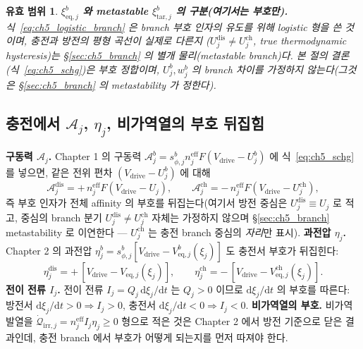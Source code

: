 \documentclass[11pt,a4paper]{article}
\newtheorem*{boundbox}{유효 범위}
\newcommand{\dd}{\mathrm{d}}
\newcommand{\eff}{\mathrm{eff}}
\newcommand{\eq}{\mathrm{eq}}
\newcommand{\drive}{\mathrm{drive}}
\newcommand{\irr}{\mathrm{irr}}
\newcommand{\dis}{\mathrm{dis}}
\newcommand{\chg}{\mathrm{ch}}
\newcommand{\tar}{\mathrm{tar}}
\begin{document}
\begin{boundbox}
\textbf{$\xi_{\eq,j}^b$ 와 metastable $\xi_{\tar,j}^b$ 의 구분(여기서는 부호만).} 식~\eqref{eq:ch5_logistic_branch}
은 branch 부호 인자의 유도를 위해 logistic 형을 쓴 것이며, 충전과 방전의 평형 곡선이 \emph{실제로 다른지}
($U_j^\dis\ne U_j^\chg$, true thermodynamic hysteresis)는 \S\ref{sec:ch5_branch} 의 별개 물리(metastable
branch)다. 본 절의 결론(식~\eqref{eq:ch5_schg})은 부호 정합이며, $U_j^b,w_j^b$ 의 branch 차이를 가정하지
않는다(그것은 \S\ref{sec:ch5_branch} 의 metastability 가 정한다).
\end{boundbox}

\subsection{충전에서 $\mathcal A_j$, $\eta_j$, 비가역열의 부호 뒤집힘}\label{sec:ch5_sign_flip}
\textbf{구동력 $\mathcal A_j$.} Chapter 1 의 구동력 $\mathcal A_j^b=s_{\phi,j}^b n_j^{\eff}F(V_\drive-U_j^b)$ 에
식~\eqref{eq:ch5_schg} 를 넣으면, 같은 전위 편차 $(V_\drive-U_j^b)$ 에 대해
\begin{equation}
\mathcal A_j^\dis=+\,n_j^{\eff}F(V_\drive-U_j),\qquad
\mathcal A_j^\chg=-\,n_j^{\eff}F(V_\drive-U_j^\chg),
\label{eq:ch5_A_branch}
\end{equation}
즉 부호 인자가 전체 affinity 의 부호를 뒤집는다(여기서 방전 중심은 $U_j^\dis\equiv U_j$ 로 적고, 중심의 branch
분기 $U_j^\dis\ne U_j^\chg$ 자체는 가정하지 않으며 \S\ref{sec:ch5_branch} metastability 로 이연한다 — $U_j^\chg$ 는
충전 branch 중심의 \emph{자리}만 표시). \textbf{과전압 $\eta_j$.} Chapter 2 의 과전압 $\eta_j^b=s_{\phi,j}^b
[V_\drive-V_{\eq,j}^b(\xi_j)]$ 도 충전서 부호가 뒤집힌다:
\begin{equation}
\eta_j^\dis=+\,[V_\drive-V_{\eq,j}(\xi_j)],\qquad
\eta_j^\chg=-\,[V_\drive-V_{\eq,j}^\chg(\xi_j)].
\label{eq:ch5_eta_branch}
\end{equation}
\textbf{전이 전류 $I_j$.} 전이 전류 $I_j=Q_j\,\dd\xi_j/\dd t$ 는 $Q_j>0$ 이므로 $\dd\xi_j/\dd t$ 의 부호를 따른다:
방전서 $\dd\xi_j/\dd t>0\Rightarrow I_j>0$, 충전서 $\dd\xi_j/\dd t<0\Rightarrow I_j<0$. \textbf{비가역열의 부호.}
비가역 발열을 $\dot{\mathcal Q}_{\irr,j}=n_j^{\eff}I_j\eta_j\ge0$ 형으로 적은 것은 Chapter 2 에서 방전 기준으로
닫은 결과인데, 충전 branch 에서 부호가 어떻게 되는지를 먼저 따져야 한다.
\end{document}
